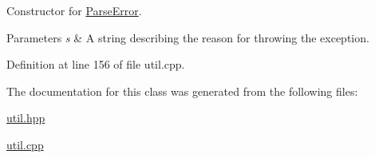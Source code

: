 \-Constructor for \hyperlink{classLibWheel_1_1ParseError}{\-Parse\-Error}. 


\begin{DoxyParams}{\-Parameters}
{\em s} & \-A string describing the reason for throwing the exception. \\
\hline
\end{DoxyParams}


\-Definition at line 156 of file util.\-cpp.



\-The documentation for this class was generated from the following files\-:\begin{DoxyCompactItemize}
\item 
\hyperlink{util_8hpp}{util.\-hpp}\item 
\hyperlink{util_8cpp}{util.\-cpp}\end{DoxyCompactItemize}

